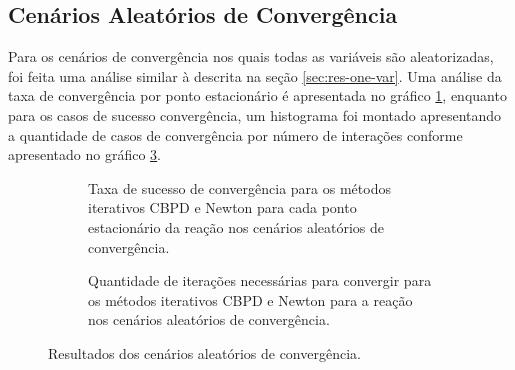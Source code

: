 \subsection{Cenários Aleatórios de Convergência}

Para os cenários de convergência nos quais todas as variáveis são aleatorizadas, foi feita uma análise similar à descrita na seção \ref{sec:res-one-var}. Uma análise da taxa de convergência por ponto estacionário é apresentada no gráfico \ref{fig:result-mult-var-conv-tax}, enquanto para os casos de sucesso convergência, um histograma foi montado apresentando a quantidade de casos de convergência por número de interações conforme apresentado no gráfico \ref{fig:result-mult-var-conv-metric}.

\begin{figure}
  \begin{subfigure}{.5\textwidth}
    \begin{center}
      
%     
    \end{center}
    \caption{Taxa de sucesso de convergência para os métodos iterativos CBPD e Newton para cada ponto estacionário da reação  nos cenários aleatórios de convergência.}
    \label{fig:result-mult-var-conv-tax}
  \end{subfigure}%
  \begin{subfigure}{.5\textwidth}
    \begin{center}
      
%     
    \end{center}
    \caption{Quantidade de iterações necessárias para convergir para os métodos iterativos CBPD e Newton para a reação  nos cenários aleatórios de convergência.}
    \label{fig:result-mult-var-conv-metric}
  \end{subfigure}
  \caption{Resultados dos cenários aleatórios de convergência.}
\end{figure}
